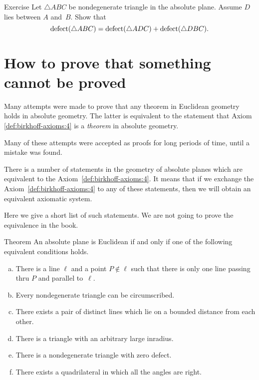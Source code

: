 \begin{thm}{Exercise}\label{ex:defect}
Let $\triangle ABC$ be nondegenerate triangle in the absolute plane.
Assume $D$ lies between $A$ and~$B$.
Show that 
$$\mathop{\rm defect}\nolimits(\triangle ABC)=\mathop{\rm defect}\nolimits(\triangle ADC)+\mathop{\rm defect}\nolimits(\triangle DBC).$$

\end{thm}



\section*{How to prove that something\\ 
cannot be proved}

Many attempts were made to prove that any theorem in Euclidean geometry holds in absolute geometry.
The latter is equivalent to the statement that Axiom \ref{def:birkhoff-axioms:4} is a {}\emph{theorem} in absolute geometry.

Many of these attempts were accepted as proofs for long periods of time, until a mistake was found.

There is a number of statements in the geometry of absolute planes which are equivalent to the Axiom~\ref{def:birkhoff-axioms:4}.
It means that if we exchange the Axiom~\ref{def:birkhoff-axioms:4}  to any of these statements, then we will obtain an equivalent axiomatic system.

Here we give a short list of such statements.
We are not going to prove the equivalence in the book.

\begin{thm}{Theorem}\label{thm:=IV}
An absolute plane is Euclidean if and only if one of the following equivalent conditions holds.
\begin{enumerate}[(a)]
\item\label{thm:=IV:main} 
There is a line $\ell$ 
and a point $P\notin\ell$ 
such that there is only one line passing thru $P$ 
and parallel to~$\ell$.
\item 
Every nondegenerate triangle can be circumscribed.
\item
There exists a pair of distinct lines which lie on a bounded distance from each other.
\item
There is a triangle with an arbitrary large inradius.
\item
There is a nondegenerate triangle with zero defect.
\item
There exists a quadrilateral in which all the angles are right.
\end{enumerate}
\end{thm}

